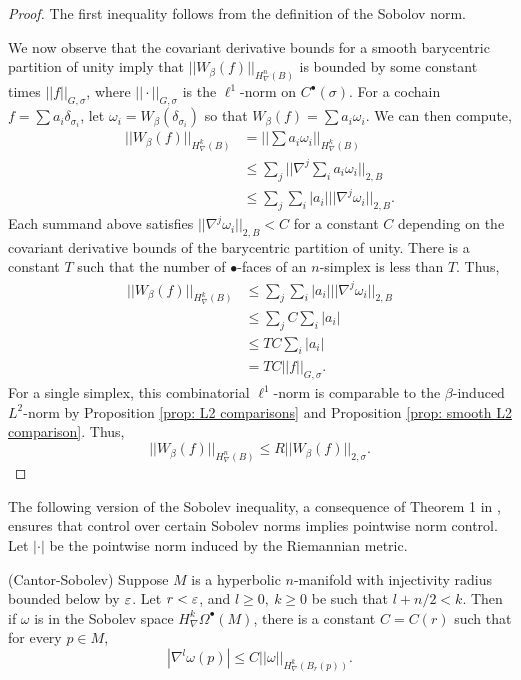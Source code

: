 \begin{proof}
The first inequality follows from the definition of the Sobolov norm.

We now observe that the covariant derivative bounds for a smooth barycentric partition of unity imply that $||W_{\beta}(f)||_{H^n_{\nabla}(B)}$ is bounded by some constant times $||f||_{G,\sigma}$, where $||\cdot||_{G,\sigma}$ is the $\ell^1$-norm on $C^{\bullet}(\sigma)$. For a cochain $f = \sum a_i \delta_{\sigma_i}$, let $\omega_i = W_{\beta}(\delta_{\sigma_i})$ so that $W_{\beta}(f) = \sum a_i \omega_i$. We can then compute,
\begin{align*}
	||W_{\beta}(f)||_{H^k_{\nabla}(B)} &= ||\sum a_i\omega_i||_{H^k_{\nabla}(B)}\\
	&\leq \sum_j||\nabla^j \sum_i  a_i\omega_i||_{2,B}\\
	&\leq  \sum_j\sum_i|a_i|||\nabla^j \omega_i||_{2,B}.
\end{align*}
Each summand above satisfies $||\nabla^j\omega_i||_{2,B}<C$ for a constant $C$ depending on the covariant derivative bounds of the barycentric partition of unity. There is a constant $T$ such that the number of $\bullet$-faces of an $n$-simplex is less than $T$.
Thus, \begin{align*}
 ||W_{\beta}(f)||_{H^k_{\nabla}(B)} &\leq \sum_j\sum_i|a_i|||\nabla^j \omega_i||_{2,B} \\
&\leq \sum_jC\sum_i|a_i|\\
&\leq TC\sum_i|a_i| \\
&= TC||f||_{G,\sigma}.
\end{align*}
 For a single simplex, this combinatorial $\ell^1$-norm is comparable to the $\beta$-induced $L^2$-norm by Proposition \ref{prop: L2 comparisons} and Proposition \ref{prop: smooth L2 comparison}. Thus, $$||W_{\beta}(f)||_{H^n_{\nabla}(B)}\leq R||W_{\beta}(f)||_{2,\sigma}.$$
\end{proof}

The following version of the Sobolev inequality, a consequence of Theorem 1 in \cite{cantor}, ensures that control over certain Sobolev norms implies pointwise norm control. Let $|\cdot|$ be the pointwise norm induced by the Riemannian metric.

\begin{thm} \label{thm: Cantor Sobolev}(Cantor-Sobolev)
Suppose $M$ is a hyperbolic $n$-manifold with injectivity radius bounded below by $\varepsilon$. Let $r<\varepsilon$, and $l\geq 0,~k\geq 0$ be such that $l + n/2 < k$. Then if $\omega$ is in the Sobolev space $H^k_{\nabla} \Omega^{\bullet}(M)$, there is a constant $C = C(r)$ such that for every $p\in M$, $$|\nabla^l\omega(p)|\leq C||\omega||_{H_{\nabla}^k(B_r(p))}.$$
\end{thm}


